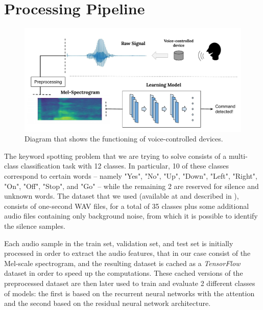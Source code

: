 

\section{Processing Pipeline}
\label{sec:processing_architecture}

\begin{figure}[htbp]
\centerline{\includegraphics[scale=.6]{processing_pipeline.pdf}}
\caption{Diagram that shows the functioning of voice-controlled devices.}
\label{fig}
\end{figure}
 

The keyword spotting problem that we are trying to solve consists of a multi-class classification task with 12 classes. In particular, 10 of these classes correspond to certain words -- namely "Yes", "No", "Up", "Down", "Left", "Right", "On", "Off", "Stop", and "Go" -- while the remaining 2 are reserved for silence and unknown words.
The dataset that we used (available at \cite{5} and described in \cite{4}), consists of one-second WAV files, for a total of 35 classes plus some additional audio files containing only background noise, from which it is possible to identify the silence samples.


Each audio sample in the train set, validation set, and test set is initially processed in order to extract the audio features, that in our case consist of the Mel-scale spectrogram, and the resulting dataset is cached as a \textit{TensorFlow} dataset in order to speed up the computations.
These cached versions of the preprocessed dataset are then later used to train and evaluate 2 different classes of models: the first is based on the recurrent neural networks with the attention and the second based on the residual neural network architecture.


